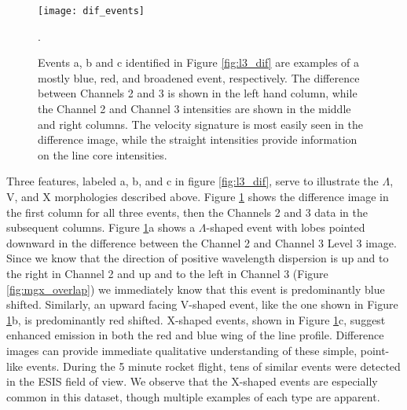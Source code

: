    	
 		\begin{figure}
  			\centering
  			\texttt{[image: dif\_events]}
  			\caption{Events a, b and c identified in Figure \ref{fig:l3_dif} are examples of a mostly blue, red, and broadened event, respectively. The difference between Channels 2 and 3 is shown in the left hand column, while the Channel 2 and Channel 3 intensities are shown in the middle and right columns.  The velocity signature is most easily seen in the difference image, while the straight intensities provide information on the line core intensities. 
  			}
  			\label{fig:dif_events}. 
  		\end{figure}

    	
    	Three features, labeled a, b, and c in figure \ref{fig:l3_dif}, serve to illustrate the $\Lambda$, V, and X morphologies described above.
    	Figure \ref{fig:dif_events} shows the difference image in the first column for all three events, then the Channels 2 and 3 data in the subsequent columns. 
    	Figure \ref{fig:dif_events}a shows a $\Lambda$-shaped event with lobes pointed downward in the difference between the Channel 2 and Channel 3 Level 3 image.
    	Since we know that the direction of positive wavelength dispersion is up and to the right in Channel 2 and up and to the left in Channel 3 (Figure \ref{fig:mgx_overlap}) we immediately know that this event is predominantly blue shifted.  
    	Similarly, an upward facing V-shaped event, like the one shown in Figure \ref{fig:dif_events}b, is predominantly red shifted.
    	X-shaped events, shown in Figure \ref{fig:dif_events}c, suggest enhanced emission in both the red and blue wing of the line profile. 
    	Difference images can provide immediate qualitative understanding of these simple, point-like events.  
    	During the 5 minute rocket flight, tens of similar events were detected in the ESIS field of view.  
    	We observe that the X-shaped events are especially common in this dataset, though multiple examples of each 
    	type are apparent.
    	
